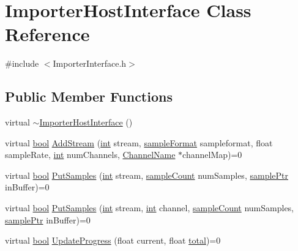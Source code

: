 \hypertarget{class_importer_host_interface}{}\section{Importer\+Host\+Interface Class Reference}
\label{class_importer_host_interface}


{\ttfamily \#include $<$Importer\+Interface.\+h$>$}

\subsection*{Public Member Functions}
\begin{DoxyCompactItemize}
\item 
virtual \hyperlink{class_importer_host_interface_aa1b3f449c8af64337430314da2093cce}{$\sim$\+Importer\+Host\+Interface} ()
\item 
virtual \hyperlink{mac_2config_2i386_2lib-src_2libsoxr_2soxr-config_8h_abb452686968e48b67397da5f97445f5b}{bool} \hyperlink{class_importer_host_interface_a301db3aa527fc911dfe3e041fb56b1fc}{Add\+Stream} (\hyperlink{xmltok_8h_a5a0d4a5641ce434f1d23533f2b2e6653}{int} stream, \hyperlink{include_2audacity_2_types_8h_a9938d2e2f6adef23e745cd80ef379792}{sample\+Format} sampleformat, float sample\+Rate, \hyperlink{xmltok_8h_a5a0d4a5641ce434f1d23533f2b2e6653}{int} num\+Channels, \hyperlink{include_2audacity_2_types_8h_ae4152d23ffb2c6b90ca7d72b90d85c04}{Channel\+Name} $\ast$channel\+Map)=0
\item 
virtual \hyperlink{mac_2config_2i386_2lib-src_2libsoxr_2soxr-config_8h_abb452686968e48b67397da5f97445f5b}{bool} \hyperlink{class_importer_host_interface_a0f1edfb6401feb97306cd22adf3d321e}{Put\+Samples} (\hyperlink{xmltok_8h_a5a0d4a5641ce434f1d23533f2b2e6653}{int} stream, \hyperlink{include_2audacity_2_types_8h_afa427e1f521ea5ec12d054e8bd4d0f71}{sample\+Count} num\+Samples, \hyperlink{include_2audacity_2_types_8h_aaafb46d1caf7c79262fec96b577215fe}{sample\+Ptr} in\+Buffer)=0
\item 
virtual \hyperlink{mac_2config_2i386_2lib-src_2libsoxr_2soxr-config_8h_abb452686968e48b67397da5f97445f5b}{bool} \hyperlink{class_importer_host_interface_a5addd058428d5d3b47e11ac2edf2940b}{Put\+Samples} (\hyperlink{xmltok_8h_a5a0d4a5641ce434f1d23533f2b2e6653}{int} stream, \hyperlink{xmltok_8h_a5a0d4a5641ce434f1d23533f2b2e6653}{int} channel, \hyperlink{include_2audacity_2_types_8h_afa427e1f521ea5ec12d054e8bd4d0f71}{sample\+Count} num\+Samples, \hyperlink{include_2audacity_2_types_8h_aaafb46d1caf7c79262fec96b577215fe}{sample\+Ptr} in\+Buffer)=0
\item 
virtual \hyperlink{mac_2config_2i386_2lib-src_2libsoxr_2soxr-config_8h_abb452686968e48b67397da5f97445f5b}{bool} \hyperlink{class_importer_host_interface_ab23734ef040fa5749c95b955e04ac860}{Update\+Progress} (float current, float \hyperlink{nyx_8c_a245b65fbced50370bf8a01069e5ee177}{total})=0
\end{DoxyCompactItemize}


